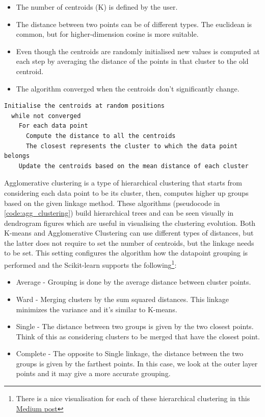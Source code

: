 \begin{itemize}
  \item The number of centroids (K) is defined by the user.
  \item The distance between two points can be of different types. The euclidean is common, but for higher-dimension cosine is more suitable.
  \item Even though the centroids are randomly initialised new values is computed at each step by averaging the distance of the points in that cluster to the old centroid.
  \item The algorithm converged when the centroids don't significantly change.
\end{itemize}

\begin{lstlisting}[caption={K-means pseudocode}, label={code:k-means}]
  Initialise the centroids at random positions
  while not converged 
    For each data point
      Compute the distance to all the centroids
      The closest represents the cluster to which the data point belongs
    Update the centroids based on the mean distance of each cluster
\end{lstlisting} 

Agglomerative clustering is a type of hierarchical clustering that starts from considering each data point to be its cluster, then, computes higher up groups based on the given linkage method. These algorithms (pseudocode in \cref{code:agg_clustering}) build hierarchical trees and can be seen visually in dendrogram figures which are useful in visualising the clustering evolution. Both K-means and Agglomerative Clustering can use different types of distances, but the latter does not require to set the number of centroids, but the linkage needs to be set. This setting configures the algorithm how the datapoint grouping is performed and the Scikit-learn supports the following\footnote{
  There is a nice visualisation for each of these hierarchical clustering in this \href{https://towardsdatascience.com/machine-learning-algorithms-part-12-hierarchical-agglomerative-clustering-example-in-python-1e18e0075019}{Medium post} }:
\begin{itemize}
  \item Average - Grouping is done by the average distance between cluster points.
  \item Ward - Merging clusters by the sum squared distances. This linkage minimizes the variance and it's similar to K-means.
  \item Single - The distance between two groups is given by the two closest points. Think of this as considering clusters to be merged that have the closest point.
  \item Complete - The opposite to Single linkage, the distance between the two groups is given by the farthest points. In this case, we look at the outer layer points and it may give a more accurate grouping.
\end{itemize}


